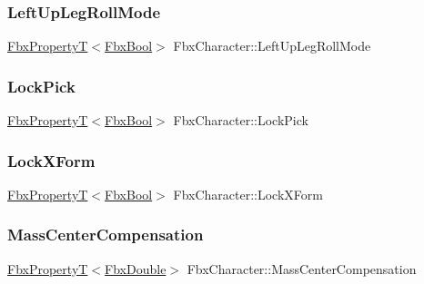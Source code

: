 \mbox{\label{class_fbx_character_a84a8c860549c7a6ae3f2c38535286501}} 
\subsubsection{\texorpdfstring{Left\+Up\+Leg\+Roll\+Mode}{LeftUpLegRollMode}}
{\footnotesize\ttfamily \hyperlink{class_fbx_property_t}{Fbx\+PropertyT}$<$\hyperlink{fbxtypes_8h_a92e0562b2fe33e76a242f498b362262e}{Fbx\+Bool}$>$ Fbx\+Character\+::\+Left\+Up\+Leg\+Roll\+Mode}

\mbox{\label{class_fbx_character_aebb6c968bc52b7fa922f7b16b7161ac6}} 
\subsubsection{\texorpdfstring{Lock\+Pick}{LockPick}}
{\footnotesize\ttfamily \hyperlink{class_fbx_property_t}{Fbx\+PropertyT}$<$\hyperlink{fbxtypes_8h_a92e0562b2fe33e76a242f498b362262e}{Fbx\+Bool}$>$ Fbx\+Character\+::\+Lock\+Pick}

\mbox{\label{class_fbx_character_a76c5887a0ed952165cca32f065d2899c}} 
\subsubsection{\texorpdfstring{Lock\+X\+Form}{LockXForm}}
{\footnotesize\ttfamily \hyperlink{class_fbx_property_t}{Fbx\+PropertyT}$<$\hyperlink{fbxtypes_8h_a92e0562b2fe33e76a242f498b362262e}{Fbx\+Bool}$>$ Fbx\+Character\+::\+Lock\+X\+Form}

\mbox{\label{class_fbx_character_ac19cd028c848d564b39a0b5d1986f8d8}} 
\subsubsection{\texorpdfstring{Mass\+Center\+Compensation}{MassCenterCompensation}}
{\footnotesize\ttfamily \hyperlink{class_fbx_property_t}{Fbx\+PropertyT}$<$\hyperlink{fbxtypes_8h_a171e72a1c46fc15c1a6c9c31948c1c5b}{Fbx\+Double}$>$ Fbx\+Character\+::\+Mass\+Center\+Compensation}

